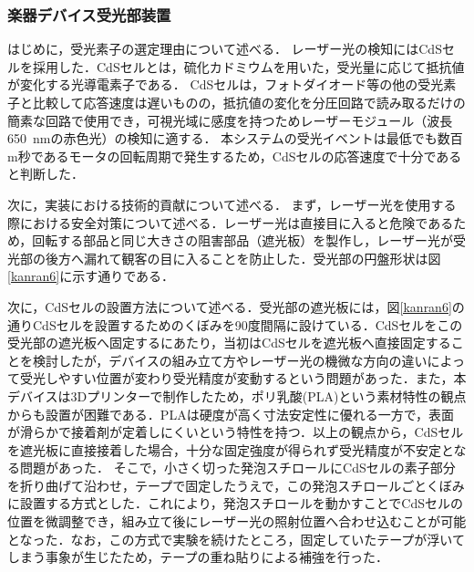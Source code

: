 
\FloatBarrier

\subsubsection{楽器デバイス受光部装置}
\label{sec:jissou_jukou}

はじめに，受光素子の選定理由について述べる．
レーザー光の検知にはCdSセルを採用した．CdSセルとは，硫化カドミウムを用いた，受光量に応じて抵抗値が変化する光導電素子である．
CdSセルは，フォトダイオード等の他の受光素子と比較して応答速度は遅いものの，抵抗値の変化を分圧回路で読み取るだけの簡素な回路で使用でき，可視光域に感度を持つためレーザーモジュール（波長\SI{650}{nm}の赤色光）の検知に適する．
本システムの受光イベントは最低でも数百 m秒であるモータの回転周期で発生するため，CdSセルの応答速度で十分であると判断した．

次に，実装における技術的貢献について述べる．
まず，レーザー光を使用する際における安全対策について述べる．レーザー光は直接目に入ると危険であるため，回転する部品と同じ大きさの阻害部品（遮光板）を製作し，レーザー光が受光部の後方へ漏れて観客の目に入ることを防止した．受光部の円盤形状は図\ref{kanran6}に示す通りである．

\noindent
次に，CdSセルの設置方法について述べる．受光部の遮光板には，図\ref{kanran6}の通りCdSセルを設置するためのくぼみを90度間隔に設けている．CdSセルをこの受光部の遮光板へ固定するにあたり，当初はCdSセルを遮光板へ直接固定することを検討したが，デバイスの組み立て方やレーザー光の機微な方向の違いによって受光しやすい位置が変わり受光精度が変動するという問題があった．また，本デバイスは3Dプリンターで制作したため，ポリ乳酸(PLA)という素材特性の観点からも設置が困難である．PLAは硬度が高く寸法安定性に優れる一方で，表面が滑らかで接着剤が定着しにくいという特性を持つ．以上の観点から，CdSセルを遮光板に直接接着した場合，十分な固定強度が得られず受光精度が不安定となる問題があった．
そこで，小さく切った発泡スチロールにCdSセルの素子部分を折り曲げて沿わせ，テープで固定したうえで，この発泡スチロールごとくぼみに設置する方式とした．これにより，発泡スチロールを動かすことでCdSセルの位置を微調整でき，組み立て後にレーザー光の照射位置へ合わせ込むことが可能となった．なお，この方式で実験を続けたところ，固定していたテープが浮いてしまう事象が生じたため，テープの重ね貼りによる補強を行った．






